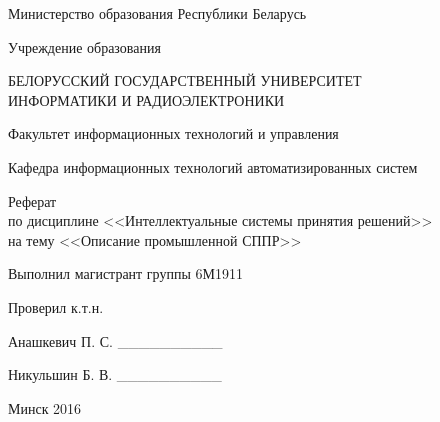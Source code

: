 \begin{titlepage}
\thispagestyle{empty}
\setlength{\parindent}{0cm} %

{\centering{}
  Министерство образования Республики Беларусь

  \smallskip
  Учреждение образования

  БЕЛОРУССКИЙ ГОСУДАРСТВЕННЫЙ УНИВЕРСИТЕТ \\
  ИНФОРМАТИКИ И РАДИОЭЛЕКТРОНИКИ

  \smallskip
  Факультет информационных технологий и управления

  \smallskip
  Кафедра информационных технологий автоматизированных систем \par
}

\vspace{60mm}

{\centering{}
  Реферат \\
  по дисциплине <<Интеллектуальные системы принятия решений>> \\
  на тему <<Описание промышленной СППР>>\par
}

\vspace{60mm}

\begin{minipage}{.55\linewidth}
  Выполнил магистрант группы 6М1911

  \smallskip
  Проверил к.т.н.
\end{minipage}
\hfill
\begin{minipage}{.4\linewidth}
  \begin{flushright}
    Анашкевич П. С. \_\_\_\_\_\_\_\_\_\_

    \smallskip
    Никульшин Б. В. \_\_\_\_\_\_\_\_\_\_
  \end{flushright}
\end{minipage}

\vfill
{\centering{}
  Минск 2016\par
}

\setlength{\parindent}{1.25cm} %
\end{titlepage}
